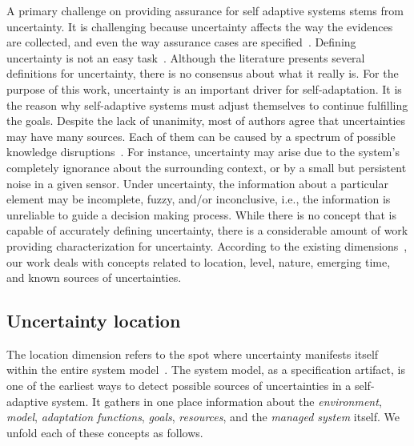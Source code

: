 A primary challenge on providing assurance for self adaptive systems stems from uncertainty. It is challenging because uncertainty affects the way the evidences are collected, and even the way assurance cases are specified~\cite{LemosAss}. Defining uncertainty is not an easy task~\cite{walker2003defining}. Although the literature presents several definitions for uncertainty, there is no consensus about what it really is. For the purpose of this work, uncertainty is an important driver for self-adaptation. It is the reason why self-adaptive systems must adjust themselves to continue fulfilling the goals. Despite the lack of unanimity, most of authors agree that uncertainties may have many sources. Each of them can be caused by a spectrum of possible knowledge disruptions~\cite{ClassUncertainty,cheung2007identifying,KM11,garlan2010software}. For instance, uncertainty may arise due to the system's completely ignorance about the surrounding context, or by a small but persistent noise in a given sensor. Under uncertainty, the information about a particular element may be incomplete, fuzzy, and/or inconclusive, i.e., the information is unreliable to guide a decision making process. While there is no concept that is capable of accurately defining uncertainty, there is a considerable amount of work providing characterization for uncertainty. According to the existing dimensions~\cite{ClassUncertainty,perez2014uncertainties,walker2003defining}, our work deals with concepts related to location, level, nature, emerging time, and known sources of uncertainties.

\subsection{Uncertainty location}

The location dimension refers to the spot where uncertainty manifests itself within the entire system model~\cite{walker2003defining}. The system model, as a specification artifact, is one of the earliest ways to detect possible sources of uncertainties in a self-adaptive system. It gathers in one place information about the \textit{environment}, \textit{model}, \textit{adaptation functions}, \textit{goals}, \textit{resources}, and the \textit{managed system} itself. We unfold each of these concepts as follows.

